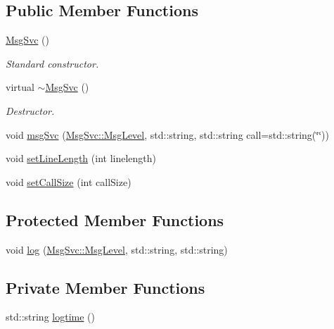 \subsection*{Public Member Functions}
\begin{DoxyCompactItemize}
\item 
\hyperlink{classMsgSvc_a67dd82487821da06312e20c1fc68b85a}{Msg\+Svc} ()
\begin{DoxyCompactList}\small\item\em Standard constructor. \end{DoxyCompactList}\item 
virtual \hyperlink{classMsgSvc_a07f15da0052e8703a89b2fc66382fe0e}{$\sim$\+Msg\+Svc} ()
\begin{DoxyCompactList}\small\item\em Destructor. \end{DoxyCompactList}\item 
void \hyperlink{classMsgSvc_ad25f18047920cc59a314e5098259711c}{msg\+Svc} (\hyperlink{classMsgSvc_ae671eb7301996cd049d2da8a65925926}{Msg\+Svc\+::\+Msg\+Level}, std\+::string, std\+::string call=std\+::string(\char`\"{}\char`\"{}))
\item 
void \hyperlink{classMsgSvc_ab741c391e80fcbf13eb2e60e48dc7536}{set\+Line\+Length} (int linelength)
\item 
void \hyperlink{classMsgSvc_a50854fb6f9df98bc170f690941747b61}{set\+Call\+Size} (int call\+Size)
\end{DoxyCompactItemize}
\subsection*{Protected Member Functions}
\begin{DoxyCompactItemize}
\item 
void \hyperlink{classMsgSvc_ad16d082e1bed97d14344d4942664d370}{log} (\hyperlink{classMsgSvc_ae671eb7301996cd049d2da8a65925926}{Msg\+Svc\+::\+Msg\+Level}, std\+::string, std\+::string)
\end{DoxyCompactItemize}
\subsection*{Private Member Functions}
\begin{DoxyCompactItemize}
\item 
std\+::string \hyperlink{classMsgSvc_a74b20f11493ffbe27801bc1857fd079e}{logtime} ()
\end{DoxyCompactItemize}

